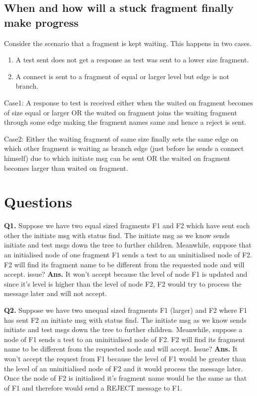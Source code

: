 \documentclass[twoside]{article}
\begin{document}
\subsection{When and how will a stuck fragment finally make progress}

Consider the scenario that a fragment is kept waiting. This happens in two cases.
\begin{enumerate}
\item A test sent does not get a response as test was sent to a lower size fragment.
\item A connect is sent to a fragment of equal or larger level but edge is not branch.
\end{enumerate}

Case1: A response to test is received either when the waited on fragment becomes of size equal or larger OR the waited on fragment joins the waiting fragment through some edge making the fragment names same and hence a reject is sent.

Case2: Either the waiting fragment of same size finally sets the same edge on which other fragment is waiting as branch edge (just before he sends a connect himself) due to which initiate msg can be sent OR the waited on fragment becomes larger than waited on fragment.

\section{Questions}
\textbf{Q1.} Suppose we have two equal sized fragments F1 and F2 which have sent each other the initiate msg with status find. The initiate msg as we know sends initiate and test msgs down the tree to further children. Meanwhile, suppose that an initialised node of one fragment F1 sends a test to an uninitialised node of F2. F2 will find its fragment name to be different from the requested node and will accept. issue?
\newline\newline \textbf{Ans.} It won’t accept because the level of node F1 is updated and since it’s level is higher than the level of node F2, F2 would try to process the message later and will not accept.

\newline\newline\textbf{Q2.} Suppose we have two unequal sized fragments F1 (larger) and F2 where F1 has sent F2 an initiate msg with status find. The initiate msg as we know sends initiate and test msgs down the tree to further children. Meanwhile, suppose a node of F1 sends a test to an uninitialised node of F2. F2 will find its fragment name to be different from the requested node and will accept. Issue?
\newline\newline \textbf{Ans.} It won’t accept the request from F1 because the level of F1 would be greater than the level of an uninitialised node of F2 and it would process the message later. Once the node of F2 is initialised it’s fragment name would be the same as that of F1 and therefore would send a REJECT message to F1.
\end{document}
